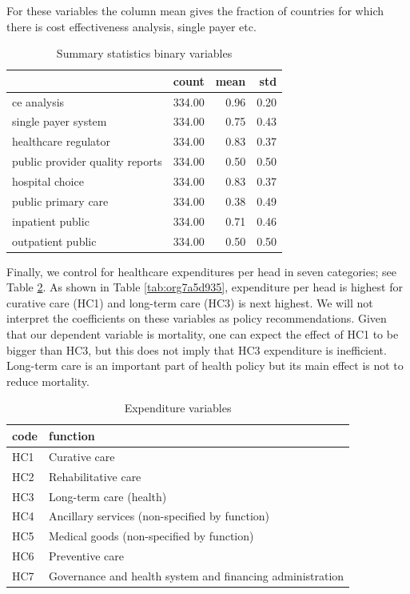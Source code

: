 \documentclass{article}
\begin{document}
For these variables the column mean gives the fraction of countries for which there is cost effectiveness analysis, single payer etc.

\begin{table}[htbp]
\caption{\label{tab:orgf7df7d1}Summary statistics binary variables}
\centering
\begin{tabular}{lrrr}
 & count & mean & std\\
\hline
ce analysis & 334.00 & 0.96 & 0.20\\
single payer system & 334.00 & 0.75 & 0.43\\
healthcare regulator & 334.00 & 0.83 & 0.37\\
public provider quality reports & 334.00 & 0.50 & 0.50\\
hospital choice & 334.00 & 0.83 & 0.37\\
public primary care & 334.00 & 0.38 & 0.49\\
inpatient public & 334.00 & 0.71 & 0.46\\
outpatient public & 334.00 & 0.50 & 0.50\\
\end{tabular}
\end{table}


Finally, we control for healthcare expenditures per head in seven categories; see Table \ref{tab:orgc24a9ee}. As shown in Table \ref{tab:org7a5d935}, expenditure per head is highest for curative care (HC1) and long-term care (HC3) is next highest. We will not interpret the coefficients on these variables as policy recommendations. Given that our dependent variable is mortality, one can expect the effect of HC1 to be bigger than HC3, but this does not imply that HC3 expenditure is inefficient. Long-term care is an important part of health policy but its main effect is not to reduce mortality.

\begin{table}[htbp]
\caption{\label{tab:orgc24a9ee}Expenditure variables}
\centering
\begin{tabular}{ll}
code & function\\
\hline
HC1 & Curative care\\
HC2 & Rehabilitative care\\
HC3 & Long-term care (health)\\
HC4 & Ancillary services (non-specified by function)\\
HC5 & Medical goods (non-specified by function)\\
HC6 & Preventive care\\
HC7 & Governance and health system and financing administration\\
\end{tabular}
\end{table}
\end{document}
